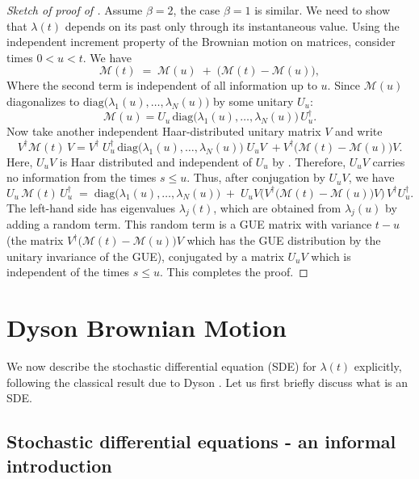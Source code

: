 \documentclass[letterpaper,11pt,oneside,reqno]{book}
\numberwithin{equation}{chapter}  %
\theoremstyle{definition}
\begin{document}
\begin{proof}[Sketch of proof of ]
Assume $\beta=2$, the case $\beta=1$ is similar.
We need to show that $\lambda(t)$ depends on its past only through its instantaneous value. Using the independent increment property of the Brownian motion on matrices,
consider times $0< u< t$. We have
\[
	\mathcal{M}(t) \;=\; \mathcal{M}(u)\;+\;\bigl(\mathcal{M}(t)-\mathcal{M}(u)\bigr),
\]
Where the second term is independent of all information up to $u$.
Since $\mathcal{M}(u)$ diagonalizes to $\mathrm{diag}\bigl(\lambda_1(u),\ldots,\lambda_N(u)\bigr)$ by some unitary $U_u$:
\begin{equation*}
	\mathcal{M}(u)=U_u\,\mathrm{diag}\bigl(\lambda_1(u),\ldots,\lambda_N(u)\bigr)\,U_u^\dagger.
\end{equation*}
Now take another independent Haar-distributed unitary matrix $V$ and 
write
\[
	V^\dagger\mathcal{M}(t)\,V=V^\dagger\;U_u^\dagger\,\mathrm{diag}\bigl(\lambda_1(u),\ldots,\lambda_N(u)\bigr)\;U_u V\;+V^\dagger\bigl(\mathcal{M}(t)-\mathcal{M}(u)\bigr)V.
\]
Here, $U_uV$ is Haar distributed and independent of $U_u$ by .
Therefore, $U_uV$ carries no information from the times $s\le u$.
Thus, after conjugation by $U_uV$, we have
\[
U_u\,\mathcal{M}(t)\,U_u^\dagger\;=\;\mathrm{diag}\bigl(\lambda_1(u),\ldots,\lambda_N(u)\bigr)\;+\; U_u V\bigl(V^\dagger\bigl(\mathcal{M}(t)-\mathcal{M}(u)\bigr)V\bigr)\,V^\dagger U_u^\dagger.
\]
The left-hand side 
has eigenvalues $\lambda_j(t)$, which are obtained from $\lambda_j(u)$
by adding a random term. 
This random term is a GUE matrix with variance $t-u$
(the matrix $V^\dagger\bigl(\mathcal{M}(t)-\mathcal{M}(u)\bigr)V$ which has the GUE distribution
by the unitary invariance of the GUE),
conjugated by a matrix $U_uV$ which is independent of the times $s \le u$.
This completes the proof.
\end{proof}

\section{Dyson Brownian Motion}
We now describe the stochastic differential equation (SDE)
for $\lambda(t)$ explicitly, following the classical result due to Dyson
\cite{dyson1962brownian}. Let us first briefly discuss what is an SDE.

\subsection{Stochastic differential equations - an informal introduction}
\end{document}
